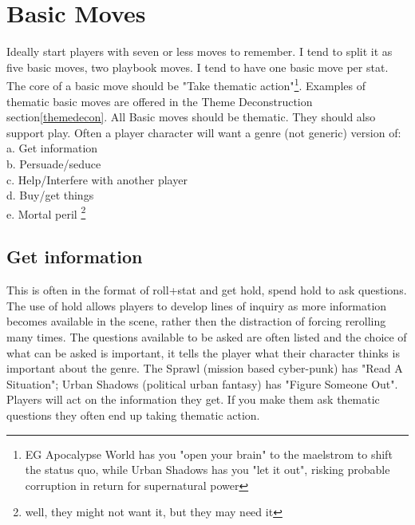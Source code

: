 \documentclass{tufte-handout}
\begin{document}
\section{Basic Moves}
Ideally start players with seven or less moves to remember. I tend to split it as five basic moves, two playbook moves. I tend to have one basic move per stat. The core of a basic move should be "Take thematic action"\footnote{EG Apocalypse World has you "open your brain" to the maelstrom to shift the status quo, while Urban Shadows has you "let it out", risking probable corruption in return for supernatural power}. Examples of thematic basic moves are offered in the Theme Deconstruction section\ref{themedecon}.
All Basic moves should be thematic. They should also support play. Often a player character will want a genre (not generic) version of:\\
a. Get information\\
b. Persuade/seduce\\
c. Help/Interfere with another player\\
d. Buy/get things\\
e. Mortal peril \footnote{well, they might not want it, but they may need it}\\

\subsection{Get information}
This is often in the format of roll+stat and get hold, spend hold to ask questions. The use of hold allows players to develop lines of inquiry as more information becomes available in the scene, rather then the distraction of forcing rerolling many times. 
The questions available to be asked are often listed and the choice of what can be asked is important, it tells the player what their character thinks is important about the genre. The Sprawl (mission based cyber-punk) has "Read A Situation"; Urban Shadows (political urban fantasy) has "Figure Someone Out".
Players will act on the information they get. If you make them ask thematic questions they often end up taking thematic action.
\end{document}
